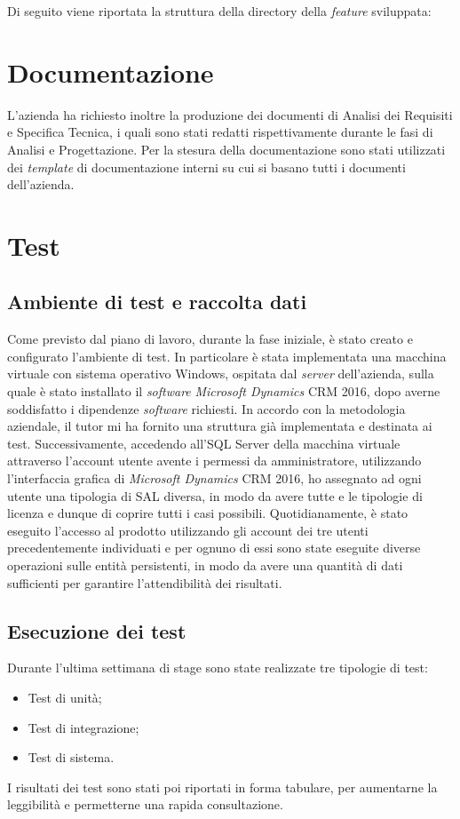 Di seguito viene riportata la struttura della directory della \emph{feature} sviluppata:


\section{Documentazione}
L’azienda ha richiesto inoltre la produzione dei documenti di Analisi dei Requisiti e Specifica Tecnica, i quali sono stati redatti rispettivamente durante le fasi di Analisi e Progettazione.
Per la stesura della documentazione sono stati utilizzati dei \emph{template} di documentazione interni su cui si basano tutti i documenti dell’azienda.
\section{Test}
\subsection{Ambiente di test e raccolta dati}
Come previsto dal piano di lavoro, durante la fase iniziale, è stato creato e configurato l'ambiente di test. In particolare è stata implementata una macchina virtuale con sistema operativo Windows, ospitata dal \emph{server} dell'azienda, sulla quale è stato installato il \emph{software} \emph{Microsoft Dynamics} CRM 2016, dopo averne soddisfatto i dipendenze \emph{software} richiesti. 
In accordo con la metodologia aziendale, il tutor mi ha fornito una struttura  già implementata e destinata ai test. Successivamente, accedendo all'SQL Server della macchina virtuale attraverso l'account utente avente i permessi da amministratore, utilizzando l'interfaccia grafica di \emph{Microsoft Dynamics} CRM 2016, ho assegnato ad ogni utente una tipologia di SAL diversa, in modo da avere tutte e le tipologie di licenza e dunque di coprire tutti i casi possibili. 
Quotidianamente, è stato eseguito l'accesso al prodotto utilizzando gli account dei tre utenti precedentemente individuati e per ognuno di essi sono state eseguite diverse operazioni sulle entità persistenti, in modo da avere una quantità di dati sufficienti per garantire l'attendibilità dei risultati.
\subsection{Esecuzione dei test}
Durante l'ultima settimana di stage sono state realizzate tre tipologie di test:
\begin{itemize}
    \item Test di unità; 
    \item Test di integrazione;
    \item Test di sistema.
\end{itemize}
I risultati dei test sono stati poi riportati in forma tabulare, per aumentarne la leggibilità e permetterne una rapida consultazione. 
